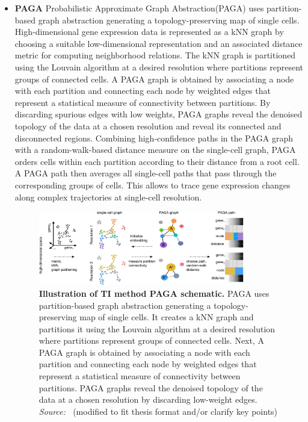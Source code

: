 \begin{itemize}
    \item \textbf{PAGA}
    Probabilistic Approximate Graph Abstraction(PAGA) uses partition-based graph abstraction generating a topology-preserving map of single cells\citep{wolf2019paga}. High-dimensional gene expression data is represented as a kNN graph by choosing a suitable low-dimensional representation and an associated distance metric for computing neighborhood relations. The kNN graph is partitioned using the Louvain algorithm at a desired resolution where partitions represent groups of connected cells. A PAGA graph is obtained by associating a node with each partition and connecting each node by weighted edges that represent a statistical measure of connectivity between partitions. By discarding spurious edges with low weights, PAGA graphs reveal the denoised topology of the data at a chosen resolution and reveal its connected and disconnected regions. Combining high-confidence paths in the PAGA graph with a random-walk-based distance measure on the single-cell graph, PAGA orders cells within each partition according to their distance from a root cell. A PAGA path then averages all single-cell paths that pass through the corresponding groups of cells. This allows to trace gene expression changes along complex trajectories at single-cell resolution.
    \begin{figure}[ht!]
    	\centering
    	\includegraphics[width=0.85\textwidth]{TI_Alg_PAGA/fig}
    	\vspace{0.1cm}
    	\caption[Illustration of TI method PAGA schematic.]{\textbf{Illustration of TI method PAGA schematic.} 
    	PAGA uses partition-based graph abstraction generating a topology-preserving map of single cells. It creates a kNN graph and partitions it using the Louvain algorithm at a desired resolution where partitions represent groups of connected cells. Next, A PAGA graph is obtained by associating a node with each partition and connecting each node by weighted edges that represent a statistical measure of connectivity between partitions. PAGA graphs reveal the denoised topology of the data at a chosen resolution by discarding low-weight edges. \emph{Source: ~\cite{wolf2019paga}}(modified to fit thesis format and/or clarify key points)
    	}
    	\label{fig:TI_Alg_PAGA}
    \end{figure}
        

\end{itemize}
